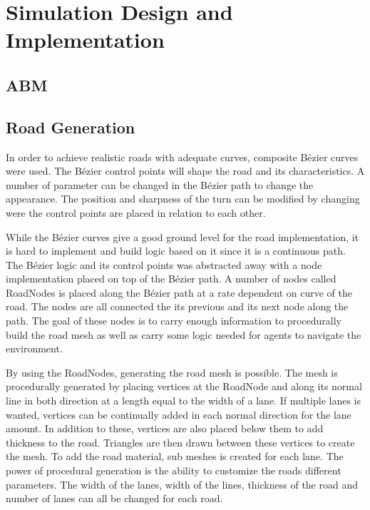 \section{Simulation Design and Implementation}

\subsection{ABM}

\subsection{Road Generation}
    In order to achieve realistic roads with adequate curves, composite Bézier curves were used. The Bézier control points will shape the road and its characteristics. A number of parameter can be changed in the Bézier path to change the appearance. The position and sharpness of the turn can be modified by changing were the control points are placed in relation to each other. 

    While the Bézier curves give a good ground level for the road implementation, it is hard to implement and build logic based on it since it is a continuous path. The Bézier logic and its control points was abstracted away with a node implementation placed on top of the Bézier path. A number of nodes called RoadNodes is placed along the Bézier path at a rate dependent on curve of the road. The nodes are all connected the its previous and its next node along the path. The goal of these nodes is to carry enough information to procedurally  build the road mesh as well as carry some logic needed for agents to navigate the environment.

    By using the RoadNodes, generating the road mesh is possible. The mesh is procedurally generated by placing vertices at the RoadNode and along its normal line in both direction at a length equal to the width of a lane. If multiple lanes is wanted, vertices can be continually added in each normal direction for the lane amount. In addition to these, vertices are also placed below them to add thickness to the road. Triangles are then drawn between these vertices to create the mesh. To add the road material, sub meshes is created for each lane. The power of procedural generation is the ability to customize the roads different parameters. The width of the lanes, width of the lines, thickness of the road and number of lanes can all be changed for each road.

